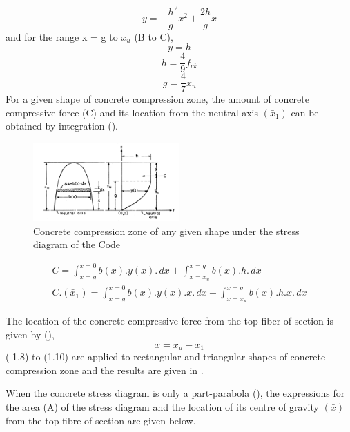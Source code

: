 \begin{equation}
y=-\frac{h}{g}^2 x^2+\frac{2h}{g} x
\end{equation}
and for the range x = g to $x_{u}$ (B to C),
\begin{equation}
y=h
\end{equation}
$$h=\frac{4}{9}f_{ck}$$
$$g=\frac{4}{7}x_u$$
For a given shape of concrete compression zone, the amount of concrete
compressive force (C) and its location from the neutral axis ${(\bar x_1)}$
can be obtained by integration ().

\begin{figure}
\centering
\includegraphics[width=0.5\textwidth]{images/concrete.png}
\caption{Concrete compression zone of any given shape under the stress diagram of the Code}
\label{fig:concrete}
\end{figure}

\begin{align}
C=\int_{x=g}^{x=0}b(x).y(x).\,dx+\int_{{x=x_u}}^{x=g}b(x).h.\,dx\\
C.(\bar x_1)=\int_{x=g}^{x=0}b(x).y(x).x.\,dx+\int_{{x=x_u}}^{x=g}b(x).h.x.\,dx
\end{align}

The location of the concrete compressive force from the top ﬁber of 
section is given by (),
\begin{equation}
\bar x=x_u-\bar x_1
\end{equation}
\eqn ( 1.8) to \eqn (1.10) are applied to rectangular and triangular
shapes of concrete compression zone and the results are given in .

When the concrete stress diagram is only a part-parabola (), 
the expressions for the area (A) of the stress diagram and the location
of its centre of gravity ${(\bar x)}$ from the top ﬁbre of section are
given below.

